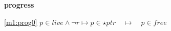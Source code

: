 \textbf{progress}
\begin{block}
\item[ \eqref{m1:prog0} ]{$p \in live \land \neg r \mapsto p \in \star ptr  \quad \mapsto\quad p \in free $} %
\end{block}
